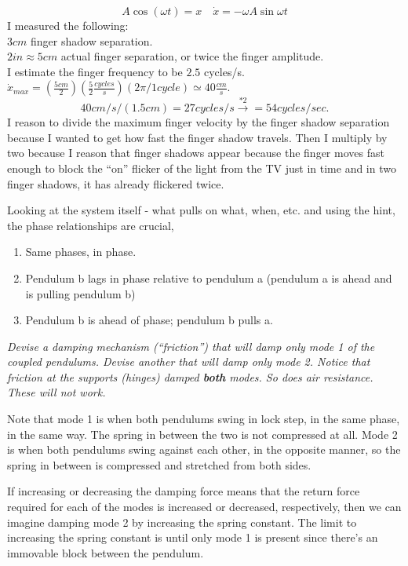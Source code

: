 \documentclass[twoside,10pt]{amsart}
\newcommand{\problemhead}[1]
  {\smallskip
   \noindent{\large\bf Problem #1.}
   \smallskip}
\begin{document}
\[
A \cos{(\omega t) } = x \quad \dot{x} = -\omega A \sin{\omega t} 
\]
I measured the following: \\
$3 cm$ finger shadow separation.  \\
$2 in \approx 5 cm$ actual finger separation, or twice the finger amplitude.  \\
I estimate the finger frequency to be $2.5$ cycles/s.  \\
$\dot{x}_{max} = \left( \frac{5 cm}{2 } \right)\left( \frac{5}{2} \frac{ cycles}{s} \right) \left( 2\pi /1 cycle \right) \simeq 40 \frac{cm}{s}$.  
\[
40 cm/s / (1.5 cm) = 27 cycles /s \xrightarrow{* 2 } = 54 cycles/sec.
\]
I reason to divide the maximum finger velocity by the finger shadow separation because I wanted to get how fast the finger shadow travels.  Then I multiply by two because I reason that finger shadows appear because the finger moves fast enough to block the ``on'' flicker of the light from the TV just in time and in two finger shadows, it has already flickered twice.  

\problemhead{1.5} Looking at the system itself - what pulls on what, when, etc. and using the hint, the phase relationships are crucial,
\begin{enumerate}
  \item Same phases, in phase.  
  \item Pendulum b lags in phase relative to pendulum a (pendulum a is ahead and is pulling pendulum b) 
  \item Pendulum b is ahead of phase; pendulum b pulls a.  
\end{enumerate}

\problemhead{1.6} \emph{ Devise a damping mechanism (``friction'') that will damp only mode 1 of the coupled pendulums.  Devise another that will damp only mode 2.  Notice that friction at the supports (hinges) damped \textbf{ both } modes.  So does air resistance.  These will not work. }  

Note that mode 1 is when both pendulums swing in lock step, in the same phase, in the same way.  The spring in between the two is not compressed at all.  Mode 2 is when both pendulums swing against each other, in the opposite manner, so the spring in between is compressed and stretched from both sides.  

If increasing or decreasing the damping force means that the return force required for each of the modes is increased or decreased, respectively, then we can imagine damping mode 2 by increasing the spring constant.  The limit to increasing the spring constant is until only mode 1 is present since there's an immovable block between the pendulum.  
\end{document}
